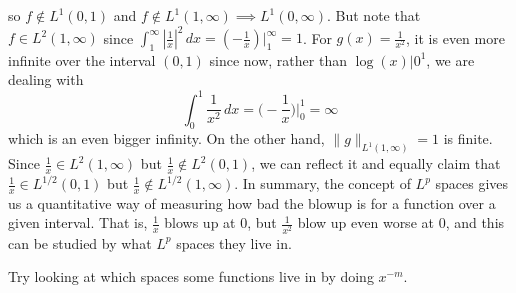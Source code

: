 	so $f \not\in L^1 (0, 1)$ and $f \not\in L^1 (1, \infty) \implies L^1 (0, \infty)$. But note that $f \in L^2 (1, \infty)$ since $\int_1^\infty |\frac{1}{x}|^2 \,dx = (-\frac{1}{x}) \big|_1^\infty = 1$. For $g(x) = \frac{1}{x^2}$, it is even more infinite over the interval $(0, 1)$ since now, rather than $\log(x)\big|0^1$, we are dealing with 
	\begin{equation}
		\int_0^1 \frac{1}{x^2} \,dx = \Big( -\frac{1}{x}\Big) \Big|_0^1 = \infty
	\end{equation}
	which is an even bigger infinity. On the other hand, $\|g\|_{L^1 (1, \infty)} = 1$ is finite. Since $\frac{1}{x} \in L^2 (1, \infty)$ but $\frac{1}{x} \not\in L^2 (0, 1)$, we can reflect it and equally claim that $\frac{1}{x} \in L^{1/2} (0, 1)$ but $\frac{1}{x} \not\in L^{1/2}(1, \infty)$. In summary, the concept of $L^p$ spaces gives us a quantitative way of measuring how bad the blowup is for a function over a given interval. That is, $\frac{1}{x}$ blows up at $0$, but $\frac{1}{x^2}$ blow up even worse at $0$, and this can be studied by what $L^p$ spaces they live in.  

	Try looking at which spaces some functions live in by doing $x^{-m}$. 

